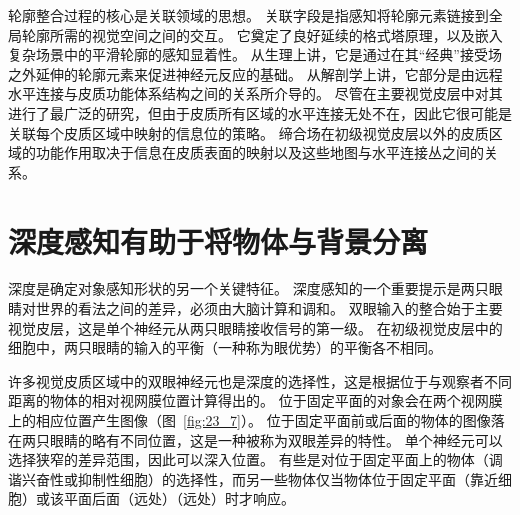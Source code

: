 轮廓整合过程的核心是关联领域的思想。
关联字段是指感知将轮廓元素链接到全局轮廓所需的视觉空间之间的交互。
它奠定了良好延续的格式塔原理，以及嵌入复杂场景中的平滑轮廓的感知显着性。
从生理上讲，它是通过在其“经典”接受场之外延伸的轮廓元素来促进神经元反应的基础。
从解剖学上讲，它部分是由远程水平连接与皮质功能体系结构之间的关系所介导的。
尽管在主要视觉皮层中对其进行了最广泛的研究，但由于皮质所有区域的水平连接无处不在，因此它很可能是关联每个皮质区域中映射的信息位的策略。
缔合场在初级视觉皮层以外的皮质区域的功能作用取决于信息在皮质表面的映射以及这些地图与水平连接丛之间的关系。



\section{深度感知有助于将物体与背景分离}

深度是确定对象感知形状的另一个关键特征。
深度感知的一个重要提示是两只眼睛对世界的看法之间的差异，必须由大脑计算和调和。
双眼输入的整合始于主要视觉皮层，这是单个神经元从两只眼睛接收信号的第一级。
在初级视觉皮层中的细胞中，两只眼睛的输入的平衡（一种称为眼优势）的平衡各不相同。


许多视觉皮质区域中的双眼神经元也是深度的选择性，这是根据位于与观察者不同距离的物体的相对视网膜位置计算得出的。
位于固定平面的对象会在两个视网膜上的相应位置产生图像（图~\ref{fig:23_7}）。
位于固定平面前或后面的物体的图像落在两只眼睛的略有不同位置，这是一种被称为双眼差异的特性。
单个神经元可以选择狭窄的差异范围，因此可以深入位置。
有些是对位于固定平面上的物体（调谐兴奋性或抑制性细胞）的选择性，而另一些物体仅当物体位于固定平面（靠近细胞）或该平面后面（远处）（远处）时才响应。



